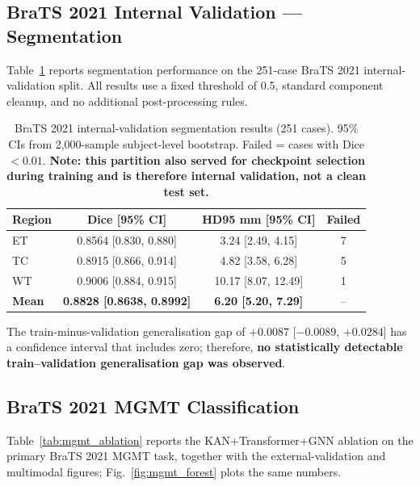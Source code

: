 \documentclass[conference]{IEEEtran}
\begin{document}
\subsection{BraTS 2021 Internal Validation --- Segmentation}

Table~\ref{tab:brats_results} reports segmentation performance on the 251-case BraTS 2021 internal-validation split. All results use a fixed threshold of 0.5, standard component cleanup, and no additional post-processing rules.

\begin{table}[!t]
\centering
\caption{BraTS 2021 internal-validation segmentation results (251 cases). 95\% CIs from 2,000-sample subject-level bootstrap. Failed = cases with Dice $<0.01$. \textbf{Note: this partition also served for checkpoint selection during training and is therefore internal validation, not a clean test set.}}
\label{tab:brats_results}
\begin{tabular}{lccc}
\toprule
\textbf{Region} & \textbf{Dice [95\% CI]} & \textbf{HD95 mm [95\% CI]} & \textbf{Failed} \\
\midrule
ET & 0.8564 [0.830, 0.880] & 3.24 [2.49, 4.15] & 7 \\
TC & 0.8915 [0.866, 0.914] & 4.82 [3.58, 6.28] & 5 \\
WT & 0.9006 [0.884, 0.915] & 10.17 [8.07, 12.49] & 1 \\
\midrule
\textbf{Mean} & \textbf{0.8828 [0.8638, 0.8992]} & \textbf{6.20 [5.20, 7.29]} & -- \\
\bottomrule
\end{tabular}
\end{table}

The train-minus-validation generalisation gap of $+0.0087$ [$-0.0089$, $+0.0284$] has a confidence interval that includes zero; therefore, \textbf{no statistically detectable train--validation generalisation gap was observed}.

\subsection{BraTS 2021 MGMT Classification}
\label{sec:mgmt_results}

Table~\ref{tab:mgmt_ablation} reports the KAN+Transformer+GNN ablation on the primary BraTS 2021 MGMT task, together with the external-validation and multimodal figures; Fig.~\ref{fig:mgmt_forest} plots the same numbers.
\end{document}
